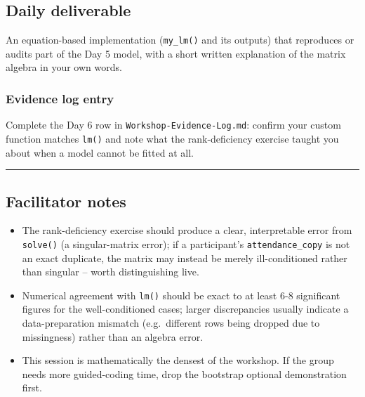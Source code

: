 \documentclass[11pt]{article}
\providecommand{\tightlist}{%
  \setlength{\itemsep}{0pt}\setlength{\parskip}{0pt}}
\begin{document}
\hypertarget{daily-deliverable}{%
\subsection{Daily deliverable}\label{daily-deliverable}}

An equation-based implementation (\texttt{my\_lm()} and its outputs)
that reproduces or audits part of the Day 5 model, with a short written
explanation of the matrix algebra in your own words.

\hypertarget{evidence-log-entry}{%
\subsubsection{Evidence log entry}\label{evidence-log-entry}}

Complete the Day 6 row in \texttt{Workshop-Evidence-Log.md}: confirm
your custom function matches \texttt{lm()} and note what the
rank-deficiency exercise taught you about when a model cannot be fitted
at all.

\begin{center}\rule{0.5\linewidth}{0.5pt}\end{center}

\hypertarget{facilitator-notes}{%
\subsection{Facilitator notes}\label{facilitator-notes}}

\begin{itemize}
\tightlist
\item
  The rank-deficiency exercise should produce a clear, interpretable
  error from \texttt{solve()} (a singular-matrix error); if a
  participant's \texttt{attendance\_copy} is not an exact duplicate, the
  matrix may instead be merely ill-conditioned rather than singular --
  worth distinguishing live.
\item
  Numerical agreement with \texttt{lm()} should be exact to at least 6-8
  significant figures for the well-conditioned cases; larger
  discrepancies usually indicate a data-preparation mismatch
  (e.g.~different rows being dropped due to missingness) rather than an
  algebra error.
\item
  This session is mathematically the densest of the workshop. If the
  group needs more guided-coding time, drop the bootstrap optional
  demonstration first.
\end{itemize}
\end{document}
